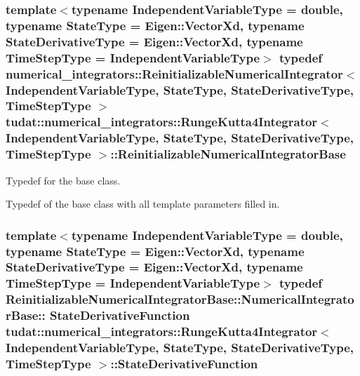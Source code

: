 \subsubsection[{\texorpdfstring{Reinitializable\+Numerical\+Integrator\+Base}{ReinitializableNumericalIntegratorBase}}]{\setlength{\rightskip}{0pt plus 5cm}template$<$typename Independent\+Variable\+Type  = double, typename State\+Type  = Eigen\+::\+Vector\+Xd, typename State\+Derivative\+Type  = Eigen\+::\+Vector\+Xd, typename Time\+Step\+Type  = Independent\+Variable\+Type$>$ typedef {\bf numerical\+\_\+integrators\+::\+Reinitializable\+Numerical\+Integrator}$<$ Independent\+Variable\+Type, State\+Type, State\+Derivative\+Type, Time\+Step\+Type $>$ {\bf tudat\+::numerical\+\_\+integrators\+::\+Runge\+Kutta4\+Integrator}$<$ Independent\+Variable\+Type, State\+Type, State\+Derivative\+Type, Time\+Step\+Type $>$\+::{\bf Reinitializable\+Numerical\+Integrator\+Base}}\hypertarget{classtudat_1_1numerical__integrators_1_1RungeKutta4Integrator_a87be34775c0f99b2b0087aa2f1b438fd}{}\label{classtudat_1_1numerical__integrators_1_1RungeKutta4Integrator_a87be34775c0f99b2b0087aa2f1b438fd}


Typedef for the base class. 

Typedef of the base class with all template parameters filled in. 
\subsubsection[{\texorpdfstring{State\+Derivative\+Function}{StateDerivativeFunction}}]{\setlength{\rightskip}{0pt plus 5cm}template$<$typename Independent\+Variable\+Type  = double, typename State\+Type  = Eigen\+::\+Vector\+Xd, typename State\+Derivative\+Type  = Eigen\+::\+Vector\+Xd, typename Time\+Step\+Type  = Independent\+Variable\+Type$>$ typedef Reinitializable\+Numerical\+Integrator\+Base\+::\+Numerical\+Integrator\+Base\+:: {\bf State\+Derivative\+Function} {\bf tudat\+::numerical\+\_\+integrators\+::\+Runge\+Kutta4\+Integrator}$<$ Independent\+Variable\+Type, State\+Type, State\+Derivative\+Type, Time\+Step\+Type $>$\+::{\bf State\+Derivative\+Function}}\hypertarget{classtudat_1_1numerical__integrators_1_1RungeKutta4Integrator_a53d233a642d328b40ea1ccc0bd218cd1}{}\label{classtudat_1_1numerical__integrators_1_1RungeKutta4Integrator_a53d233a642d328b40ea1ccc0bd218cd1}


